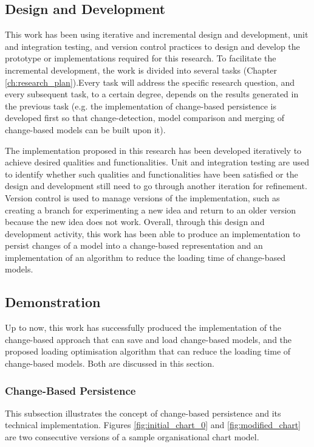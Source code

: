 \documentclass[12pt, a4paper]{report} \usepackage[titletoc]{appendix}
\begin{document}
\subsection{Design and Development}
\label{subsec:design_and_development}
This work has been using iterative and incremental design and development, unit and integration testing, and version control practices to design and develop the prototype or implementations required for this research. To facilitate the incremental development, the work is divided into several tasks (Chapter \ref{ch:research_plan}).Every task will address the specific research question, and every subsequent task, to a certain degree, depends on the results generated in the previous task (e.g. the implementation of change-based persistence is developed first so that change-detection, model comparison and merging of change-based models can be built upon it). 

The implementation proposed in this research has been developed iteratively to achieve desired qualities and functionalities. Unit and integration testing are used to identify whether such qualities and functionalities have been satisfied or the design and development still need to go through another iteration for refinement. Version control is used to manage versions of the implementation, such as creating a branch for experimenting a new idea and return to an older version because the new idea does not work. Overall, through this design and development activity, this work has been able to produce an implementation to persist changes of a model into a change-based representation and an implementation of an algorithm to reduce the loading time of change-based models.

\subsection{Demonstration}
\label{subsec:demonstration}
Up to now, this work has successfully produced the implementation of the change-based approach that can save and load change-based models, and the proposed loading optimisation algorithm that can reduce the loading time of change-based models. Both are discussed in this section. 

\subsubsection{Change-Based Persistence}
\label{change-based_persistence}
This subsection illustrates the concept of change-based persistence and its technical implementation. Figures \ref{fig:initial_chart_0} and \ref{fig:modified_chart} are two consecutive versions of a sample organisational chart model. 
\end{document}
